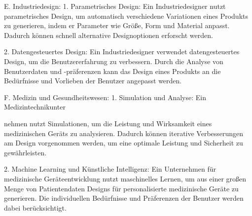 E. Industriedesign:
1. Parametrisches Design: Ein Industriedesigner nutzt parametrisches Design, um automatisch verschiedene Variationen eines Produkts zu generieren, indem er Parameter wie Größe, Form und Material anpasst. Dadurch können schnell alternative Designoptionen erforscht werden.

2. Datengesteuertes Design: Ein Industriedesigner verwendet datengesteuertes Design, um die Benutzererfahrung zu verbessern. Durch die Analyse von Benutzerdaten und -präferenzen kann das Design eines Produkts an die Bedürfnisse und Vorlieben der Benutzer angepasst werden.

F. Medizin und Gesundheitswesen:
1. Simulation und Analyse: Ein Medizintechnikunter

nehmen nutzt Simulationen, um die Leistung und Wirksamkeit eines medizinischen Geräts zu analysieren. Dadurch können iterative Verbesserungen am Design vorgenommen werden, um eine optimale Leistung und Sicherheit zu gewährleisten.

2. Machine Learning und Künstliche Intelligenz: Ein Unternehmen für medizinische Geräteentwicklung nutzt maschinelles Lernen, um aus einer großen Menge von Patientendaten Designs für personalisierte medizinische Geräte zu generieren. Die individuellen Bedürfnisse und Präferenzen der Benutzer werden dabei berücksichtigt.